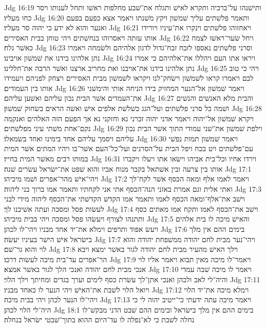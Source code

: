 Jdg 16:19  ותישׁנהו על־ברכיה ותקרא לאישׁ ותגלח את־שׁבע מחלפות ראשׁו ותחל לענותו ויסר כחו מעליו׃
Jdg 16:20  ותאמר פלשׁתים עליך שׁמשׁון ויקץ משׁנתו ויאמר אצא כפעם בפעם ואנער והוא לא ידע כי יהוה סר מעליו׃
Jdg 16:21  ויאחזוהו פלשׁתים וינקרו את־עיניו ויורידו אותו עזתה ויאסרוהו בנחשׁתים ויהי טוחן בבית האסירים׃
Jdg 16:22  ויחל שׂער־ראשׁו לצמח כאשׁר גלח׃
Jdg 16:23  וסרני פלשׁתים נאספו לזבח זבח־גדול לדגון אלהיהם ולשׂמחה ויאמרו נתן אלהינו בידנו את שׁמשׁון אויבינו׃
Jdg 16:24  ויראו אתו העם ויהללו את־אלהיהם כי אמרו נתן אלהינו בידנו את־אויבנו ואת מחריב ארצנו ואשׁר הרבה את־חללינו׃
Jdg 16:25  ויהי כי טוב לבם ויאמרו קראו לשׁמשׁון וישׂחק־לנו ויקראו לשׁמשׁון מבית האסירים ויצחק לפניהם ויעמידו אותו בין העמודים׃
Jdg 16:26  ויאמר שׁמשׁון אל־הנער המחזיק בידו הניחה אותי והימשׁני את־העמדים אשׁר הבית נכון עליהם ואשׁען עליהם׃
Jdg 16:27  והבית מלא האנשׁים והנשׁים ושׁמה כל סרני פלשׁתים ועל־הגג כשׁלשׁת אלפים אישׁ ואשׁה הראים בשׂחוק שׁמשׁון׃
Jdg 16:28  ויקרא שׁמשׁון אל־יהוה ויאמר אדני יהוה זכרני נא וחזקני נא אך הפעם הזה האלהים ואנקמה נקם־אחת משׁתי עיני מפלשׁתים׃
Jdg 16:29  וילפת שׁמשׁון את־שׁני עמודי התוך אשׁר הבית נכון עליהם ויסמך עליהם אחד בימינו ואחד בשׂמאלו׃
Jdg 16:30  ויאמר שׁמשׁון תמות נפשׁי עם־פלשׁתים ויט בכח ויפל הבית על־הסרנים ועל־כל־העם אשׁר־בו ויהיו המתים אשׁר המית במותו רבים מאשׁר המית בחייו׃
Jdg 16:31  וירדו אחיו וכל־בית אביהו וישׂאו אתו ויעלו ויקברו אותו בין צרעה ובין אשׁתאל בקבר מנוח אביו והוא שׁפט את־ישׂראל עשׂרים שׁנה׃
Jdg 17:1  ויהי־אישׁ מהר־אפרים ושׁמו מיכיהו׃
Jdg 17:2  ויאמר לאמו אלף ומאה הכסף אשׁר לקח־לך ואתי אלית וגם אמרת באזני הנה־הכסף אתי אני לקחתיו ותאמר אמו ברוך בני ליהוה׃
Jdg 17:3  וישׁב את־אלף־ומאה הכסף לאמו ותאמר אמו הקדשׁ הקדשׁתי את־הכסף ליהוה מידי לבני לעשׂות פסל ומסכה ועתה אשׁיבנו לך׃
Jdg 17:4  וישׁב את־הכסף לאמו ותקח אמו מאתים כסף ותתנהו לצורף ויעשׂהו פסל ומסכה ויהי בבית מיכיהו׃
Jdg 17:5  והאישׁ מיכה לו בית אלהים ויעשׂ אפוד ותרפים וימלא את־יד אחד מבניו ויהי־לו לכהן׃
Jdg 17:6  בימים ההם אין מלך בישׂראל אישׁ הישׁר בעיניו יעשׂה׃
Jdg 17:7  ויהי־נער מבית לחם יהודה ממשׁפחת יהודה והוא לוי והוא גר־שׁם׃
Jdg 17:8  וילך האישׁ מהעיר מבית לחם יהודה לגור באשׁר ימצא ויבא הר־אפרים עד־בית מיכה לעשׂות דרכו׃
Jdg 17:9  ויאמר־לו מיכה מאין תבוא ויאמר אליו לוי אנכי מבית לחם יהודה ואנכי הלך לגור באשׁר אמצא׃
Jdg 17:10  ויאמר לו מיכה שׁבה עמדי והיה־לי לאב ולכהן ואנכי אתן־לך עשׂרת כסף לימים וערך בגדים ומחיתך וילך הלוי׃
Jdg 17:11  ויואל הלוי לשׁבת את־האישׁ ויהי הנער לו כאחד מבניו׃
Jdg 17:12  וימלא מיכה את־יד הלוי ויהי־לו הנער לכהן ויהי בבית מיכה׃
Jdg 17:13  ויאמר מיכה עתה ידעתי כי־ייטיב יהוה לי כי היה־לי הלוי לכהן׃
Jdg 18:1  בימים ההם אין מלך בישׂראל ובימים ההם שׁבט הדני מבקשׁ־לו נחלה לשׁבת כי לא־נפלה לו עד־היום ההוא בתוך־שׁבטי ישׂראל בנחלה׃
